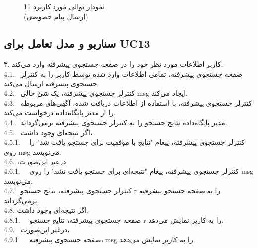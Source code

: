 \documentclass[12pt]{article}
\begin{document}
	\begin{figure}[H]
		\centering
		\caption{نمودار توالی مورد کاربرد 11\\
			(ارسال پیام خصوصی)
		}
		\label{fig:sd-uc11}
	\end{figure}

	\newpage
	\subsection{سناریو و مدل تعامل برای UC13}
	۳. کاربر اطلاعات مورد نظر خود را در صفحه جستجوی پیشرفته وارد می‌کند.\\
	4.1. \ صفحه جستجوی پیشرفته، تمامی اطلاعات وارد شده توسط کاربر را به کنترلر جستجوی پیشرفته ارسال می‌کند.\\
	4.2. \ کنترلر جستجوی پیشرفته، یک شئ خالی msg ایجاد می‌کند.\\
	4.3. \ کنترلر جستجوی پیشرفته، با استفاده از اطلاعات دریافت شده، آگهی‌های مربوطه را از مدیر پایگاه‌داده درخواست می‌کند.\\
	4.4. \ مدیر پایگاه‌داده نتایج جستجو را به کنترلر جستجوی پیشرفته برمی‌گرداند.\\
	4.5. \ اگر نتیجه‌ای وجود داشت،\\
	4.5.1. \ \ کنترلر جستجوی پیشرفته، پیغام "نتایج با موفقیت برای جستجو یافت شد" را روی msg می‌نویسد.\\
	4.6.  ‫درﻏﻴﺮ‬ ‫اﻳﻦ‬‌ﺻﻮرت‪،‬‬\\
	4.6.1. \ \ کنترلر جستجوی پیشرفته، پیغام "نتیجه‌ای برای جستجو یافت نشد" را روی msg می‌نویسد.\\
	4.7. \ کنترلر جستجوی پیشرفته، نتایج جستجو r را به صفحه جستجو پیشرفته برمی‌گرداند.\\
	4.8.  اگر نتیجه‌ای وجود داشت،\\
	4.8.1. \ \ صفحه جستجوی پیشرفته، نتایج جستجو r را به کاربر نمایش می‌دهد.\\
	4.9. \ در‌غیر این‌صورت،\\
	4.9.1. \ \ صفحه جستجوی پیشرفته، msg را به کاربر نمایش می‌دهد.\\
\end{document}
